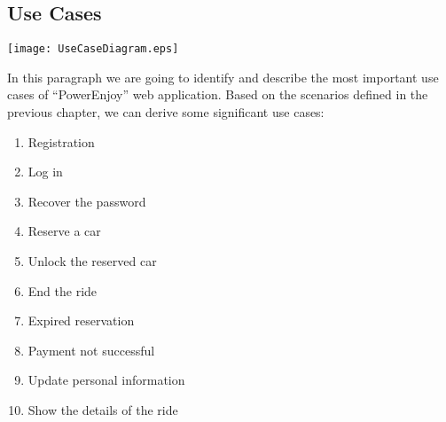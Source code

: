 \pagebreak
\subsection{Use Cases}
\centerline{
	\vspace{2cm}
		\texttt{[image: UseCaseDiagram.eps]}}



\pagebreak
In this paragraph we are going to identify and describe the most important use cases of ``PowerEnjoy'' web application.
Based on the scenarios defined in the previous chapter, we can derive some significant use cases:
\begin{enumerate}
	\item Registration
	\item Log in
	\item Recover the password
	\item Reserve a car
	\item Unlock the reserved car
	\item End the ride
	\item Expired reservation
	\item Payment not successful
	\item Update personal information
	\item Show the details of the ride
\end{enumerate}

\newtoggle{exception}
\newenvironment{UseCase}[5]{
	\paragraph{Partecipating actors:} #1
	\paragraph{Entry condition:} #2
	\paragraph{Flow of events:}
	\begin{itemize} 
		#3 
	\end{itemize}
	\paragraph{Exit condition:} #4
	\iftoggle{exception}{
		\paragraph{Exceptions:}
		\begin{itemize}
			#5
		\end{itemize}
	}{
	}
}{}


